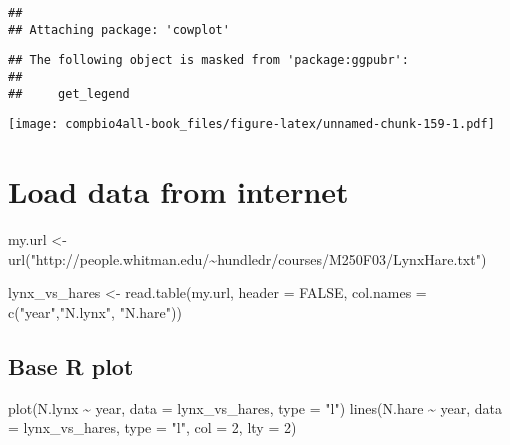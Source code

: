 \documentclass[
]{book}
\newenvironment{Shaded}{\begin{snugshade}}{\end{snugshade}}
\newcommand{\AttributeTok}[1]{\textcolor[rgb]{0.77,0.63,0.00}{#1}}
\newcommand{\ConstantTok}[1]{\textcolor[rgb]{0.00,0.00,0.00}{#1}}
\newcommand{\DecValTok}[1]{\textcolor[rgb]{0.00,0.00,0.81}{#1}}
\newcommand{\FunctionTok}[1]{\textcolor[rgb]{0.00,0.00,0.00}{#1}}
\newcommand{\NormalTok}[1]{#1}
\newcommand{\OtherTok}[1]{\textcolor[rgb]{0.56,0.35,0.01}{#1}}
\newcommand{\SpecialCharTok}[1]{\textcolor[rgb]{0.00,0.00,0.00}{#1}}
\newcommand{\StringTok}[1]{\textcolor[rgb]{0.31,0.60,0.02}{#1}}
\begin{document}
\begin{verbatim}
## 
## Attaching package: 'cowplot'
\end{verbatim}

\begin{verbatim}
## The following object is masked from 'package:ggpubr':
## 
##     get_legend
\end{verbatim}

\texttt{[image: compbio4all-book\_files/figure-latex/unnamed-chunk-159-1.pdf]}

\hypertarget{load-data-from-internet}{%
\chapter{Load data from internet}\label{load-data-from-internet}}

\begin{Shaded}
\begin{Highlighting}[]
\NormalTok{my.url }\OtherTok{\textless{}{-}} \FunctionTok{url}\NormalTok{(}\StringTok{"http://people.whitman.edu/\textasciitilde{}hundledr/courses/M250F03/LynxHare.txt"}\NormalTok{)}
\end{Highlighting}
\end{Shaded}

\begin{Shaded}
\begin{Highlighting}[]
\NormalTok{lynx\_vs\_hares }\OtherTok{\textless{}{-}} \FunctionTok{read.table}\NormalTok{(my.url,}
                            \AttributeTok{header =} \ConstantTok{FALSE}\NormalTok{,}
                            \AttributeTok{col.names =} \FunctionTok{c}\NormalTok{(}\StringTok{"year"}\NormalTok{,}\StringTok{"N.lynx"}\NormalTok{, }\StringTok{"N.hare"}\NormalTok{))}
\end{Highlighting}
\end{Shaded}

\hypertarget{base-r-plot}{%
\section{Base R plot}\label{base-r-plot}}

\begin{Shaded}
\begin{Highlighting}[]
\FunctionTok{plot}\NormalTok{(N.lynx }\SpecialCharTok{\textasciitilde{}}\NormalTok{ year, }\AttributeTok{data =}\NormalTok{ lynx\_vs\_hares, }\AttributeTok{type =} \StringTok{"l"}\NormalTok{)}
\FunctionTok{lines}\NormalTok{(N.hare }\SpecialCharTok{\textasciitilde{}}\NormalTok{ year, }\AttributeTok{data =}\NormalTok{ lynx\_vs\_hares, }\AttributeTok{type =} \StringTok{"l"}\NormalTok{, }\AttributeTok{col =} \DecValTok{2}\NormalTok{, }\AttributeTok{lty =} \DecValTok{2}\NormalTok{)}
\end{Highlighting}
\end{Shaded}
\end{document}
